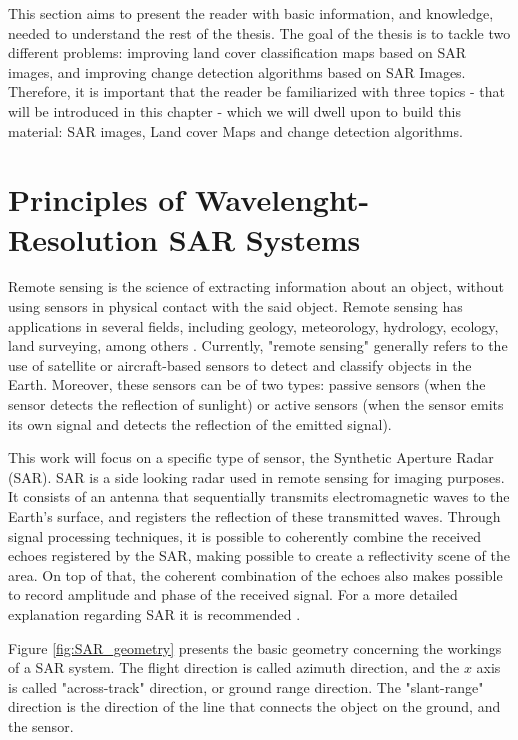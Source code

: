This section aims to present the reader with basic information, and knowledge, needed to understand the rest of the thesis. 
The goal of the thesis is to tackle two different problems: improving land cover classification maps based on SAR images, and improving 
change detection algorithms based on SAR Images. 
Therefore, it is important that the reader be familiarized with three topics - that will be introduced in this chapter - which we will dwell upon to build this material: SAR images, Land cover Maps and
change detection algorithms.

\section{Principles of Wavelenght-Resolution SAR Systems}
Remote sensing is the science of extracting information about an object, without using sensors in physical contact with the said object. Remote sensing has applications in several fields, including geology, meteorology, hydrology, ecology, land surveying, among others \cite{survey-rs}. Currently, "remote sensing" generally refers to the use of satellite or aircraft-based sensors to detect and classify objects in the Earth. Moreover, these sensors can be of two types: passive sensors (when the sensor detects the reflection of sunlight) or active sensors (when the sensor emits its own signal and detects the reflection of the emitted signal).

This work will focus on a specific type of sensor, the Synthetic Aperture Radar (SAR).
SAR is a side looking radar used in remote sensing for imaging purposes. It consists of an antenna that sequentially transmits electromagnetic waves to the Earth's surface, and registers the reflection of these transmitted waves. Through signal processing techniques, it is possible to coherently combine the received echoes registered by the SAR, making possible to create a reflectivity scene of the area. On top of that, the coherent combination of the echoes also makes possible to record amplitude and phase of the received signal. For a more detailed explanation regarding SAR it is recommended \cite{livro}.

Figure \ref{fig:SAR_geometry} presents the basic geometry concerning the workings of a SAR system. The flight direction is called azimuth direction, and the $x$ axis is called "across-track" direction, or ground range direction. The "slant-range" direction is the direction of the line that connects the object on the ground, and the sensor.

